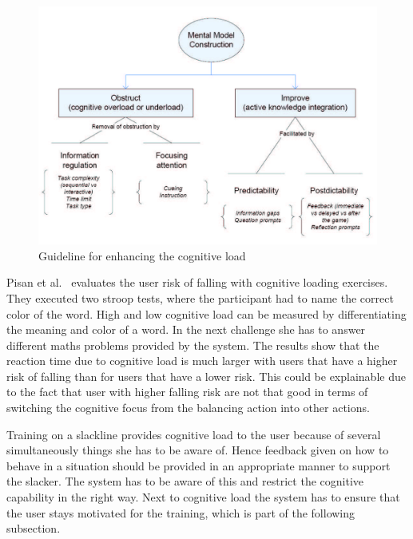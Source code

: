 \begin{figure}[htb]
	\centering
	\begin{minipage}[t]{0.8\linewidth}
		\centering
		\includegraphics[width=1\linewidth]{Pictures/mentalModelConstruction}
		\caption{Guideline for enhancing the cognitive load~\cite{Van_der_Spek2010-fe}}
		\label{fig:mentalModelConstruction}
	\end{minipage}
\end{figure}

Pisan et al.~\cite{Pisan2013-sf} evaluates the user risk of falling with cognitive loading exercises. They executed two stroop tests, where the participant had to name the correct color of the word. High and low cognitive load can be measured by differentiating the meaning and color of a word. In the next challenge she has to answer different maths problems provided by the system. The results show that the reaction time due to cognitive load is much larger with users that have a higher risk of falling than for users that have a lower risk. This could be explainable due to the fact that user with higher falling risk are not that good in terms of switching the cognitive focus from the balancing action into other actions. 

Training on a slackline provides cognitive load to the user because of several simultaneously things she has to be aware of. Hence feedback given on how to behave in a situation should be provided in an appropriate manner to support the slacker. The system has to be aware of this and restrict the cognitive capability in the right way. Next to cognitive load the system has to ensure that the user stays motivated for the training, which is part of the following subsection.

